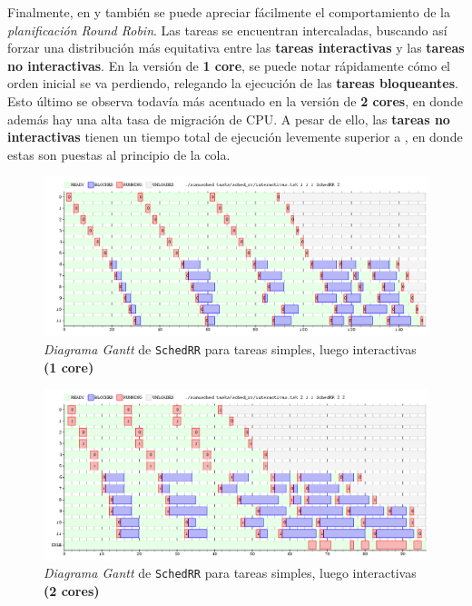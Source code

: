 \documentclass[11pt, a4paper, twoside]{article}
\begin{document}
Finalmente, en  y  
 también se puede apreciar 
fácilmente el comportamiento de la \emph{planificación Round Robin}. Las tareas
se encuentran intercaladas, buscando así forzar una distribución más equitativa
entre las \textbf{tareas interactivas} y las \textbf{tareas no interactivas}. En
la versión de \textbf{1 core}, se puede notar rápidamente cómo el orden inicial
se va perdiendo, relegando la ejecución de las \textbf{tareas bloqueantes}. Esto
último se observa todavía más acentuado en la versión de \textbf{2 cores}, en
donde además hay una alta tasa de migración de CPU. A pesar de ello, las
\textbf{tareas no interactivas} tienen un tiempo total de ejecución levemente
superior a , en donde estas son puestas al
principio de la cola.

\begin{figure}
  \centering
  \includegraphics [width=\textwidth]{../graficos/sched_rr/interactivas1-1.png}
  \caption{\emph{Diagrama Gantt} de \texttt{SchedRR} para tareas simples, luego interactivas \textbf{(1 core)}}
  \label{fig:gantt-sched-rr-interactivas1-1}
\end{figure}

\begin{figure}
  \centering
  \includegraphics [width=\textwidth]{../graficos/sched_rr/interactivas1-2.png}
  \caption{\emph{Diagrama Gantt} de \texttt{SchedRR} para tareas simples, luego interactivas \textbf{(2 cores)}}
  \label{fig:gantt-sched-rr-interactivas1-2}
\end{figure}
\end{document}
